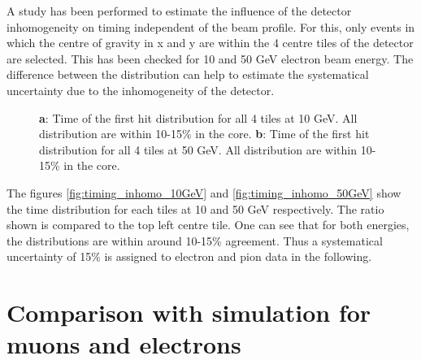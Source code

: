 \documentclass[twoside,a4paper,11pt]{article}
\begin{document}
A study has been performed to estimate the influence of the detector inhomogeneity on timing independent of the beam profile. For this, only events in which the centre of gravity in x and y are within the 4 centre tiles of the detector are selected. This has been checked for 10 and 50 GeV electron beam energy. The difference between the distribution can help to estimate the systematical uncertainty due to the inhomogeneity of the detector. 
\begin{figure}[htbp]
	\hfill
	\caption[]{\textbf{a}: Time of the first hit distribution for all 4 tiles at 10 GeV. All distribution are within 10-15\% in the core. \textbf{b}: Time of the first hit distribution for all 4 tiles at 50 GeV. All distribution are within 10-15\% in the core.}
\end{figure}
The figures \ref{fig:timing_inhomo_10GeV} and \ref{fig:timing_inhomo_50GeV} show the time distribution for each tiles at 10 and 50 GeV respectively. The ratio shown is compared to the top left centre tile. One can see that for both energies, the distributions are within around 10-15\% agreement. Thus a systematical uncertainty of 15\% is assigned to electron and pion data in the following.

\section{Comparison with simulation for muons and electrons}
\end{document}
